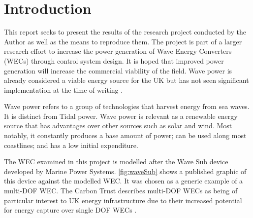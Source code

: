 \documentclass{report}
\begin{document}
\mbox{}


\printnomenclature

\chapter{Introduction}
This report seeks to present the results of the research project conducted by the Author as well as the means to reproduce them. The project is part of a larger research effort to increase the power generation of Wave Energy Converters (WECs) through control system design. It is hoped that improved power generation will increase the commercial viability of the field. Wave power is already considered a viable energy source for the UK \cite{carbonTrust} but has not seen significant implementation at the time of writing \cite{europeanMarineEnergyCenter}.

Wave power refers to a group of technologies that harvest energy from sea waves. It is distinct from Tidal power. Wave power is relevant as a renewable energy source that has advantages over other sources such as solar and wind. Most notably, it constantly produces a base amount of power; can be used along most coastlines; and has a low initial expenditure. \cite{carbonTrust}

The WEC examined in this project is modelled after the Wave Sub device developed by Marine Power Systems\cite{waveSub}. \ref{fig:waveSub} shows a published graphic\cite{waveSub} of this device against the modelled WEC. It was chosen as a generic example of a multi-DOF WEC. The Carbon Trust describes multi-DOF WECs as being of particular interest to UK energy infrastructure due to their increased potential for energy capture over single DOF WECs \cite{carbonTrust}.
\end{document}
